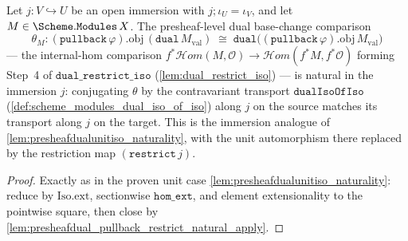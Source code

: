 \begin{lemma}
  \label{lem:presheafdual_pullback_restrict_natural}
  Let \(j : V \hookrightarrow U\) be an open immersion with \(j \mathbin{;} \iota_U = \iota_V\), and let
  \(M \in \Scheme.\mathtt{Modules}\,X\). The presheaf-level dual base-change comparison
  \[
    \theta_M : (\mathtt{pullback}\,\varphi).\mathrm{obj}\,(\mathtt{dual}\,M_{\mathrm{val}})
      \;\cong\; \mathtt{dual}\bigl((\mathtt{pullback}\,\varphi).\mathrm{obj}\,M_{\mathrm{val}}\bigr)
  \]
  --- the internal-hom comparison
  \(f^{*}\mathcal{H}om(M, \mathcal{O}) \to \mathcal{H}om(f^{*}M, f^{*}\mathcal{O})\) forming Step~4 of
  \(\mathtt{dual\_restrict\_iso}\) (\cref{lem:dual_restrict_iso}) --- is natural in the immersion
  \(j\): conjugating \(\theta\) by the contravariant transport \(\mathtt{dualIsoOfIso}\)
  (\cref{def:scheme_modules_dual_iso_of_iso}) along \(j\) on the source matches its transport along
  \(j\) on the target. This is the immersion analogue of \cref{lem:presheafdualunitiso_naturality},
  with the unit automorphism there replaced by the restriction map \((\mathtt{restrict}\,j)\).
\end{lemma}
\begin{proof}
  Exactly as in the proven unit case \cref{lem:presheafdualunitiso_naturality}: reduce by
  \(\mathrm{Iso.ext}\), sectionwise \(\mathtt{hom\_ext}\), and element extensionality to the pointwise
  square, then close by \cref{lem:presheafdual_pullback_restrict_natural_apply}.
\end{proof}

